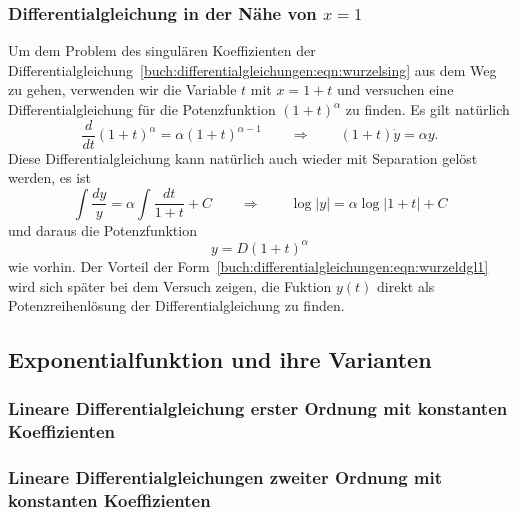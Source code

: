 \subsubsection{Differentialgleichung in der Nähe von $x=1$}
Um dem Problem des singulären Koeffizienten der
Differentialgleichung~\eqref{buch:differentialgleichungen:eqn:wurzelsing}
aus dem Weg zu gehen, verwenden wir die Variable $t$ mit $x=1+t$ und
versuchen eine Differentialgleichung für die Potenzfunktion
$(1+t)^\alpha$ zu finden.
Es gilt natürlich
\begin{equation}
\frac{d}{dt} (1+t)^\alpha
=
\alpha (1+t)^{\alpha-1}
\qquad\Rightarrow\qquad
(1+t) \dot{y} = \alpha y.
\label{buch:differentialgleichungen:eqn:wurzeldgl1}
\end{equation}
Diese Differentialgleichung kann natürlich auch wieder mit Separation
gelöst werden, es ist
\begin{equation}
\int
\frac{dy}{y} 
=
\alpha
\int
\frac{dt}{1+t}
+
C
\qquad\Rightarrow\qquad
\log|y| = \alpha \log|1+t| + C
\label{buch:differentialgleichungen:eqn:wurzeldgl1loesung}
\end{equation}
und daraus die Potenzfunktion
\[
y=D(1+t)^\alpha
\]
wie vorhin.
Der Vorteil der
Form~\eqref{buch:differentialgleichungen:eqn:wurzeldgl1}
wird sich später bei dem Versuch zeigen, die Fuktion $y(t)$
direkt als Potenzreihenlösung der Differentialgleichung zu finden.


\subsection{Exponentialfunktion und ihre Varianten
\label{buch:differentialgleichungen:subsection:exponentialfunktion}}

\subsubsection{Lineare Differentialgleichung erster Ordnung mit konstanten Koeffizienten}

\subsubsection{Lineare Differentialgleichungen zweiter Ordnung mit konstanten Koeffizienten}
